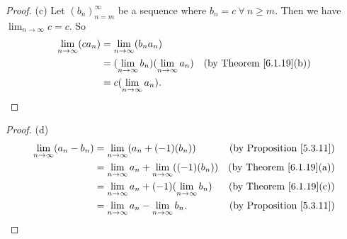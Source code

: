 \begin{proof}{(c)}
Let \((b_n)_{n = m}^\infty\) be a sequence where \(b_n = c \ \forall\ n \geq m\).
Then we have \(\lim_{n \to \infty} c = c\).
So
\begin{align*}
\lim_{n \to \infty} (c a_n) &= \lim_{n \to \infty} (b_n a_n) \\
&= (\lim_{n \to \infty} b_n)(\lim_{n \to \infty} a_n) & \text{(by Theorem \ref{6.1.19}(b))} \\
&= c(\lim_{n \to \infty} a_n).
\end{align*}
\end{proof}

\begin{proof}{(d)}
\begin{align*}
\lim_{n \to \infty} (a_n - b_n) &= \lim_{n \to \infty} (a_n + (-1)(b_n)) & \text{(by Proposition \ref{5.3.11})} \\
&= \lim_{n \to \infty} a_n + \lim_{n \to \infty} ((-1)(b_n)) & \text{(by Theorem \ref{6.1.19}(a))} \\
&= \lim_{n \to \infty} a_n + (-1)(\lim_{n \to \infty} b_n) & \text{(by Theorem \ref{6.1.19}(c))} \\
&= \lim_{n \to \infty} a_n - \lim_{n \to \infty} b_n. & \text{(by Proposition \ref{5.3.11})}
\end{align*}
\end{proof}

